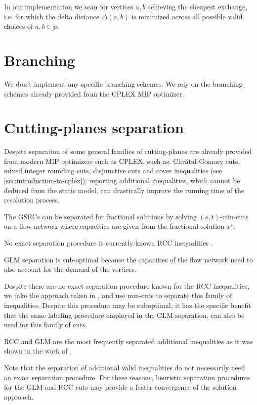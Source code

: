 In our implementation
we scan for vertices $a, b$ achieving the cheapest exchange,
i.e. for which the delta distance $\Delta(a, b)$ is minimized across all possible valid choices of $a, b \in p$.

\section{Branching}
\label{sec:impl-branching}

We don't implement any specific branching schemes.
We rely on the branching schemes already provided from the CPLEX MIP optimizer.


\section{Cutting-planes separation}
\label{sec:impl-separation-techniques}

Despite separation of some general families of cutting-planes are already provided
from modern MIP optimizers such as CPLEX, such as:
Chvátal-Gomory cuts, mixed integer rounding cuts, disjunctive cuts
and cover inequalities (see \cref{sec:introduction-to-cplex});
reporting additional inequalities, which cannot be deduced from the static model,
can drastically improve the running time of the resolution process.

The GSECs can be separated for fractional solutions by solving $(s, t)$-min-cuts
on a flow network where capacities are given from the fractional solution $x^\star$.

No exact separation procedure is currently known RCC inequalities \parencite{jepsen2014}.

GLM separation is sub-optimal because  the capacities
of the flow network need to also account for the demand of the vertices.

Despite there are no exact separation procedure known for the RCC inequalities,
we take the approach taken in \textcite{jepsen2014},
and use min-cuts to separate this family of inequalities.
Despite this procedure may be suboptimal, it has the specific
benefit that the same labeling procedure employed in the GLM separation,
can also be used for this family of cuts.

RCC and GLM are the most frequently separated additional inequalities
as it was shown in the work of \textcite{jepsen2014}.

Note that the separation of additional valid inequalities do not
necessarily need an exact separation procedure.
For these reasons, heuristic separation procedures for the GLM and RCC
cuts may provide a faster convergence of the solution approach.

